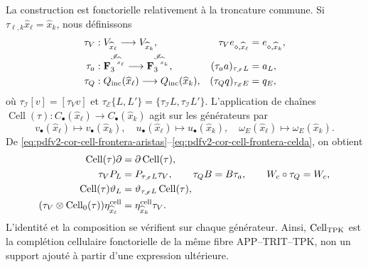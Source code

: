 La construction est fonctorielle relativement à la troncature commune. Si \(\tau_{\ell,k}\widehat x_\ell=\widehat x_k\), nous définissons
\begin{align*}
 \tau_V&:V_{\widehat x_\ell}\longrightarrow V_{\widehat x_k},&
 \tau_Ve_{\diamond,\widehat x_\ell}&=e_{\diamond,\widehat x_k},\\
 \tau_a&:\mathbf F_3^{\mathscr I_{\widehat x_\ell}}
          \longrightarrow\mathbf F_3^{\mathscr I_{\widehat x_k}},&
 (\tau_aa)_{\tau_{\mathscr I}L}&=a_L,\\
 \tau_Q&:Q_{\rm inc}(\widehat x_\ell)
          \longrightarrow Q_{\rm inc}(\widehat x_k),&
 (\tau_Qq)_{\tau_{\mathscr E}E}&=q_E,
\end{align*}
où \(\tau_{\mathscr I}[v]=[\tau_Vv]\) et \(\tau_{\mathscr E}\{L,L'\}=\{\tau_{\mathscr I}L,
\tau_{\mathscr I}L'\}\). L'application de chaînes \(\operatorname{Cell}(\tau):C_\bullet(\widehat x_\ell)
\to C_\bullet(\widehat x_k)\) agit sur les générateurs par
\begin{equation}
\label{eq:pdfv2-cor-cell-truncamiento-generadores}
 v_\bullet(\widehat x_\ell)\mapsto v_\bullet(\widehat x_k),\quad
 u_\bullet(\widehat x_\ell)\mapsto u_\bullet(\widehat x_k),\quad
 \omega_E(\widehat x_\ell)\mapsto\omega_E(\widehat x_k).
\end{equation}
De \eqref{eq:pdfv2-cor-cell-frontera-aristas}--\eqref{eq:pdfv2-cor-cell-frontera-celda}, on obtient
\begin{equation}
\label{eq:pdfv2-cor-collar-naturalidad}
\begin{aligned}
 \operatorname{Cell}(\tau)\partial
 &=\partial\operatorname{Cell}(\tau),\\
 \tau_VP_L&=P_{\tau_{\mathscr I}L}\tau_V,\qquad
 \tau_QB=B\tau_a,\qquad W_c\circ\tau_Q=W_c,\\
 \operatorname{Cell}(\tau)\vartheta_L
 &=\vartheta_{\tau_{\mathscr I}L}\operatorname{Cell}(\tau),\\
 (\tau_V\otimes\operatorname{Cell}_0(\tau))
 \eta^{\rm cell}_{\widehat x_\ell}
 &=\eta^{\rm cell}_{\widehat x_k}\tau_V.
\end{aligned}
\end{equation}
L'identité et la composition se vérifient sur chaque générateur. Ainsi, \(\operatorname{Cell}_{\rm TPK}\) est la complétion cellulaire fonctorielle de la même fibre APP--TRIT--TPK, non un support ajouté à partir d'une expression ultérieure.

